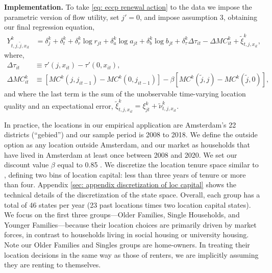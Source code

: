 \documentclass[11pt]{article}
\newcommand{\Paragraph}{\vspace{0.1cm}\noindent\textbf}
\begin{document}
\Paragraph{Implementation.} To take \ref{eq: eccp renewal action} to the data we impose the parametric version of flow utility, set $j'=0$, and impose assumption 3, obtaining our final regression equation,
\begin{align}\label{eq:final_regression_equation}
   Y^k_{t,j,\tilde{j},x_{it}}&= \delta^k_{j} +\delta^k_{t}+ \delta^k_r\log r_{jt} + \delta^k_a\log a_{jt}  +\delta^k_{b} \log b_{jt}  + \delta^k_\tau \Delta{\tau}_{it} - \Delta{MC}^k_{it} + \tilde{\xi}^k_{t,j,x_{it}},
\end{align}
where,
\begin{align*}
\Delta\tau_{it} &\equiv \tau'(j,x_{it})-\tau'(0,x_{it}),\\
\Delta{MC}^k_{it} &\equiv \left[MC^k(j,j_{it-1})-MC^k(0,j_{it-1})\right] - \beta\left[ MC^k(\tilde{j},j)-MC^k(\tilde{j},0)\right],
\end{align*}
and where the last term is the sum of the unobservable time-varying location quality and an expectational error, $\tilde{\xi}^k_{t,j,x_{it}} = \xi^k_{jt} + \tilde{\nu}^k_{t,j,x_{it}}$. 

In practice, the locations in our empirical application are Amsterdam's 22 districts (``gebied'') and our sample period is 2008 to 2018. We define the outside option as any location outside Amsterdam, and our market as households that have lived in Amsterdam at least once between 2008 and 2020. We set our discount value $\beta$ equal to 0.85 \citep{de2019subsidies,diamond2019effects}. We discretize the location tenure space similar to \cite{rust1987optimal}, defining two bins of location capital: less than three years of tenure or more than four. Appendix \ref{sec: appendix discretization of loc capital} shows the technical details of the discretization of the state space. Overall, each group has a total of 46 states per year (23 past locations times two location capital states). We focus on the first three groups---Older Families, Single Households, and Younger Families---because their location choices are primarily driven by market forces, in contrast to households living in social housing or university housing. Note our Older Families and Singles groups are home-owners. In treating their location decisions in the same way as those of renters, we are implicitly assuming they are renting to themselves.
\end{document}

